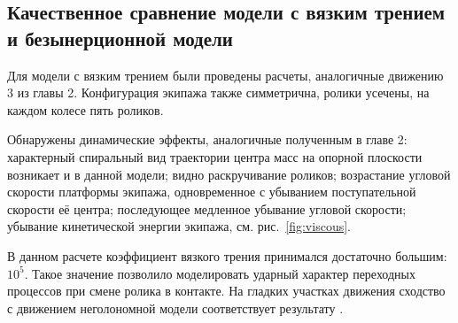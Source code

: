 \subsection{Качественное сравнение модели с вязким трением и безынерционной модели}

Для модели с вязким трением были проведены расчеты, аналогичные движению 3 из главы 2. Конфигурация экипажа также симметрична, ролики усечены, на каждом колесе пять роликов.

Обнаружены динамические эффекты, аналогичные полученным в главе 2: характерный спиральный вид траектории центра масс на опорной плоскости возникает и в данной модели; видно раскручивание роликов; возрастание угловой скорости платформы экипажа, одновременное с убыванием поступательной скорости её центра; последующее медленное убывание угловой скорости; убывание кинетической энергии экипажа, см. рис.~\ref{fig:viscous}.

В данном расчете коэффициент вязкого трения принимался достаточно большим: $10^{5}$. Такое значение позволило моделировать ударный характер переходных процессов при смене ролика в контакте. На гладких участках движения сходство с движением неголономной модели соответствует результату \cite{karapetyan1981negolonom}.

